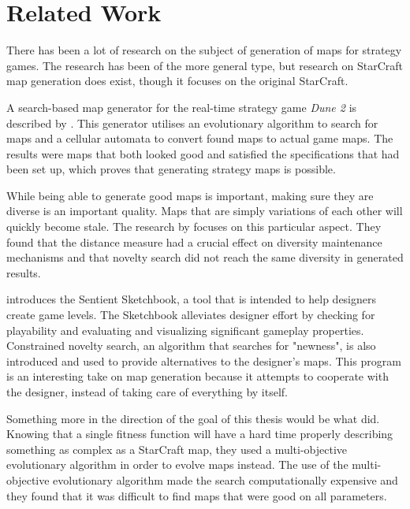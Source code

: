\chapter{Related Work}
\label{relatedwork}

There has been a lot of research on the subject of generation of maps for strategy games. The research has been of the more general type, but research on StarCraft map generation does exist, though it focuses on the original StarCraft.

A search-based map generator for the real-time strategy game \textit{Dune 2} is described by \citeauthor{Mahlmann2012Spicing}\cite{Mahlmann2012Spicing}. This generator utilises an evolutionary algorithm to search for maps and a cellular automata to convert found maps to actual game maps. The results were maps that both looked good and satisfied the specifications that had been set up, which proves that generating strategy maps is possible.

While being able to generate good maps is important, making sure they are diverse is an important quality. Maps that are simply variations of each other will quickly become stale. The research by \citeauthor{Preuss2014Searching}\cite{Preuss2014Searching} focuses on this particular aspect. They found that the distance measure had a crucial effect on diversity maintenance mechanisms and that novelty search did not reach the same diversity in generated results.

\citeauthor{Liapis2013sentient}\cite{Liapis2013sentient} introduces the Sentient Sketchbook, a tool that is intended to help designers create game levels. The Sketchbook alleviates designer effort by checking for playability and evaluating and visualizing significant gameplay properties. Constrained novelty search, an algorithm that searches for "newness",  is also introduced and used to provide alternatives to the designer's maps. This program is an interesting take on map generation because it attempts to cooperate with the designer, instead of taking care of everything by itself.

Something more in the direction of the goal of this thesis would be what \citeauthor{Togelius2010Multiobjective}\cite{Togelius2010Multiobjective} did. Knowing that a single fitness function will have a hard time properly describing something as complex as a StarCraft map, they used a multi-objective evolutionary algorithm in order to evolve maps instead. The use of the multi-objective evolutionary algorithm made the search computationally expensive and they found that it was difficult to find maps that were good on all parameters.

